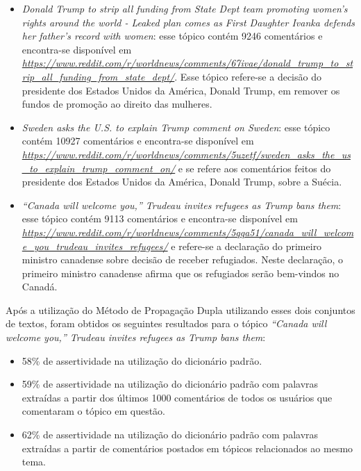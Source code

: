 \begin{itemize}
  \item
  \textit{Donald Trump to strip all funding from State Dept team promoting
  women's rights around the world - Leaked plan comes as First Daughter Ivanka
  defends her father's record with women}: esse tópico contém 9246
  comentários e encontra-se disponível em
  \textit{\url{https://www.reddit.com/r/worldnews/comments/67ivae/donald_trump_to_strip_all_funding_from_state_dept/}}.
  Esse tópico refere-se a decisão do presidente dos Estados Unidos da América,
  Donald Trump, em remover os fundos de promoção ao direito das mulheres.
  \item
  \textit{Sweden asks the U.S. to explain Trump comment on
  Sweden}: esse tópico contém 10927
  comentários e encontra-se disponível em
  \textit{\url{https://www.reddit.com/r/worldnews/comments/5uzetf/sweden_asks_the_us_to_explain_trump_comment_on/}}
  e se refere aos comentários feitos do presidente dos Estados Unidos da
  América, Donald Trump, sobre a Suécia.
  
  \item\textit{“Canada will welcome you,” Trudeau invites refugees as Trump bans
  them}: esse tópico contém 9113
  comentários e encontra-se disponível em
  \textit{\url{https://www.reddit.com/r/worldnews/comments/5qqa51/canada_will_welcome_you_trudeau_invites_refugees/}}
  e refere-se a declaração do primeiro ministro canadense sobre decisão de
  receber refugiados. Neste declaração, o primeiro ministro canadense afirma que
  os refugiados serão bem-vindos no Canadá.
\end{itemize}
 
Após a utilização do Método de Propagação Dupla utilizando esses dois conjuntos
de textos, foram obtidos os seguintes resultados para o tópico \textit{``Canada
will welcome you,” Trudeau invites refugees as Trump bans them}:
\begin{itemize}
  \item 58\% de assertividade na utilização do dicionário padrão.
  \item 59\% de assertividade na utilização do dicionário padrão com palavras
  extraídas a partir dos últimos 1000 comentários de todos os usuários que
  comentaram o tópico em questão.
  \item 62\% de assertividade na utilização do dicionário padrão com palavras
  extraídas a partir de comentários postados em tópicos relacionados ao mesmo
  tema.
\end{itemize}

